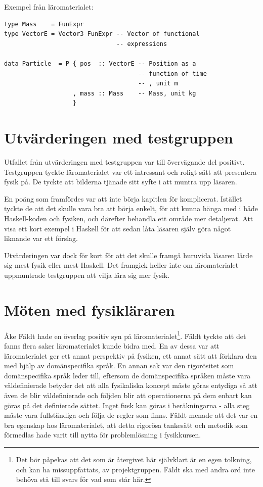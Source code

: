 Exempel från läromaterialet:
\begin{lstlisting}[frame=none, belowskip=-0.5\baselineskip, xleftmargin=0.5in]
type Mass    = FunExpr
type VectorE = Vector3 FunExpr -- Vector of functional
                               -- expressions

data Particle  = P { pos  :: VectorE -- Position as a
                                     -- function of time
                                     -- , unit m
                   , mass :: Mass    -- Mass, unit kg
                   }
\end{lstlisting}

\section{Utvärderingen med testgruppen}\label{sec:res_test}

Utfallet från utvärderingen med testgruppen var till övervägande del positivt.
Testgruppen tyckte läromaterialet var ett intressant och roligt sätt att
presentera fysik på. De tyckte att bilderna tjänade sitt syfte i att muntra upp
läsaren. 

En poäng som framfördes var att inte börja kapitlen för komplicerat. Istället
tyckte de att det skulle vara bra att börja enkelt, för att kunna hänga med i
både Haskell-koden och fysiken, och därefter behandla ett område mer
detaljerat. Att visa ett kort exempel i Haskell för att sedan låta läsaren själv
göra något liknande var ett förslag.

Utvärderingen var dock för kort för att det skulle framgå huruvida läsaren lärde
sig mest fysik eller mest Haskell. Det framgick heller inte om läromaterialet
uppmuntrade testgruppen att vilja lära sig mer fysik.

\section{Möten med fysikläraren}\label{sec:res_ake}

Åke Fäldt hade en överlag positiv syn på läromaterialet\footnote{Det bör
påpekas att det som är återgivet här självklart är en egen tolkning, och kan ha
missuppfattats, av projektgruppen. Fäldt ska med andra ord inte behöva stå till
svars för vad som står här.}. Fäldt tyckte att det fanns flera saker
läromaterialet kunde bidra med. En av dessa var att läromaterialet ger ett annat
perspektiv på fysiken, ett annat sätt att förklara den med
hjälp av domänspecifika språk. En annan sak var den rigorösitet som
domänspecifika språk leder till, eftersom de domänspecifika språken måste vara
väldefinierade betyder det att alla fysikaliska koncept måste göras entydiga så
att även de blir väldefinierade och följden blir att operationerna på dem
enbart kan göras på det definierade sättet. Inget fusk kan göras i
beräkningarna - alla steg måste vara fullständiga och följa de regler som finns.
Fäldt menade att det var en bra egenskap hos läromaterialet, att detta rigorösa
tankesätt och metodik som förmedlas hade varit till nytta för problemlösning i
fysikkursen.

